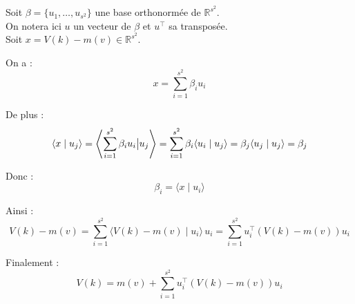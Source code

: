 Soit \(\beta = \{u_{1}, \ldots, u_{s^{2}}\}\) une base orthonormée de \(\mathbb{R}^{s^{2}}\).\\
On notera ici \(u\) un vecteur de \(\beta\) et \(u^{\top}\) sa transposée. \\

Soit \(x = V(k) - m(v) \in \mathbb{R}^{s^{2}}\).

On a :
\[
x = \sum_{i=1}^{s^{2}} \beta_{i} u_{i}
\]

De plus :
\[
\langle x \mid u_{j} \rangle = \left\langle \sum_{i=1}^{s^{2}} \beta_{i} u_{i} \big{|} u_{j} \right\rangle = \sum_{i=1}^{s^{2}} \beta_{i} \langle u_{i} \mid u_{j} \rangle = \beta_{j} \langle u_{j} \mid u_{j} \rangle = \beta_{j}
\]

Donc :
\[
\beta_{i} = \langle x \mid u_{i} \rangle
\]

Ainsi :
\[
V(k) - m(v) = \sum_{i=1}^{s^{2}} \langle V(k) - m(v) \mid u_{i} \rangle \, u_{i} = \sum_{i=1}^{s^{2}} u_{i}^{\top} \left( V(k) - m(v) \right) u_{i}
\]

Finalement :
\[
V(k) = m(v) + \sum_{i=1}^{s^{2}} u_{i}^{\top} \left( V(k) - m(v) \right) u_{i}
\]